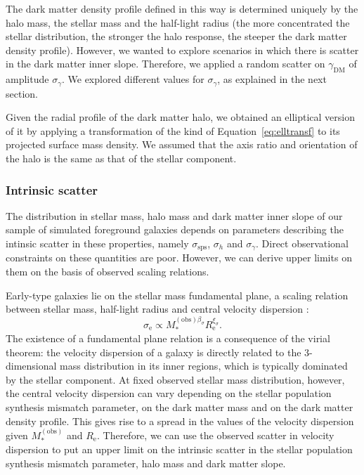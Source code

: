 \documentclass{aa}
\def\reff{R_{\mathrm{e}}}
\def\mstar{M_*}
\def\mobs{M_*^{(\mathrm{obs})}}
\def\gammadm{\gamma_{\mathrm{DM}}}
\def\Eref#1{Equation~\ref{#1}\xspace}
\begin{document}
The dark matter density profile defined in this way is determined uniquely by the halo mass, the stellar mass and the half-light radius (the more concentrated the stellar distribution, the stronger the halo response, the steeper the dark matter density profile).
However, we wanted to explore scenarios in which there is scatter in the dark matter inner slope. Therefore, we applied a random scatter on $\gammadm$ of amplitude $\sigma_{\gamma}$. We explored different values for $\sigma_{\gamma}$, as explained in the next section.

Given the radial profile of the dark matter halo, we obtained an elliptical version of it by applying a transformation of the kind of \Eref{eq:elltransf} to its projected surface mass density.
We assumed that the axis ratio and orientation of the halo is the same as that of the stellar component.

\subsubsection{Intrinsic scatter}\label{ssub:scat}

The distribution in stellar mass, halo mass and dark matter inner slope of our sample of simulated foreground galaxies depends on parameters describing the intinsic scatter in these properties, namely $\sigma_{\mathrm{sps}}$, $\sigma_h$ and $\sigma_{\gamma}$.
Direct observational constraints on these quantities are poor.
However, we can derive upper limits on them on the basis of observed scaling relations.

Early-type galaxies lie on the stellar mass fundamental plane, a scaling relation between stellar mass, half-light radius and central velocity dispersion \citep{H+B09}:
\begin{equation}\label{eq:fpcompact}
\sigma_{\mathrm{e}} \propto \mstar^{(\mathrm{obs})\beta_{\sigma}}\reff^{\xi_{\sigma}}.
\end{equation}
The existence of a fundamental plane relation is a consequence of the virial theorem: the velocity dispersion of a galaxy is directly related to the 3-dimensional mass distribution in its inner regions, which is typically dominated by the stellar component.
At fixed observed stellar mass distribution, however, the central velocity dispersion can vary depending on the stellar population synthesis mismatch parameter, on the dark matter mass and on the dark matter density profile. This gives rise to a spread in the values of the velocity dispersion given $\mobs$ and $\reff$.
Therefore, we can use the observed scatter in velocity dispersion to put an upper limit on the intrinsic scatter in the stellar population synthesis mismatch parameter, halo mass and dark matter slope.
\end{document}
